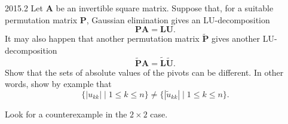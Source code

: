     \begin{pastproblem}{2015.2}
        Let $\mathbf{A}$ be an invertible square matrix. Suppose that, for a suitable permutation
        matrix $\mathbf{P}$, Gaussian elimination gives an LU-decomposition
        \[
            \mathbf{P}\mathbf{A}=\mathbf{L}\mathbf{U}.
        \]
        It may also happen that another permutation matrix $\widetilde{\mathbf{P}}$ gives another
        LU-decomposition
        \[
            \widetilde{\mathbf{P}}\mathbf{A}
            =
            \widetilde{\mathbf{L}}\widetilde{\mathbf{U}}.
        \]
        Show that the sets of absolute values of the pivots can be different. In other words, show
        by example that
        \[
            \{|u_{kk}|\mid 1\leq k\leq n\}
            \neq
            \{|\widetilde{u}_{kk}|\mid 1\leq k\leq n\}.
        \]

        \begin{hint}
            Look for a counterexample in the $2\times2$ case.
        \end{hint}
    \end{pastproblem}

